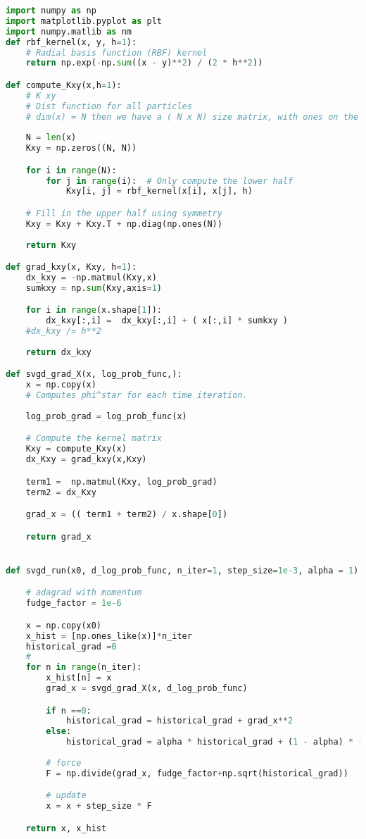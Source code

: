 \documentclass[11pt]{isr} %
\begin{document}
\begin{lstlisting}[language=Python, caption={Simple SVGD implemented}, label=code:svgd_basic]
import numpy as np
import matplotlib.pyplot as plt
import numpy.matlib as nm
def rbf_kernel(x, y, h=1):
    # Radial basis function (RBF) kernel
    return np.exp(-np.sum((x - y)**2) / (2 * h**2))

def compute_Kxy(x,h=1):
    # K xy 
    # Dist function for all particles
    # dim(x) = N then we have a ( N x N) size matrix, with ones on the diag. 
       
    N = len(x)
    Kxy = np.zeros((N, N))

    for i in range(N):
        for j in range(i):  # Only compute the lower half
            Kxy[i, j] = rbf_kernel(x[i], x[j], h)

    # Fill in the upper half using symmetry
    Kxy = Kxy + Kxy.T + np.diag(np.ones(N))
    
    return Kxy

def grad_kxy(x, Kxy, h=1):
    dx_kxy = -np.matmul(Kxy,x) 
    sumkxy = np.sum(Kxy,axis=1)

    for i in range(x.shape[1]):
        dx_kxy[:,i] =  dx_kxy[:,i] + ( x[:,i] * sumkxy )
    #dx_kxy /= h**2
    
    return dx_kxy

def svgd_grad_X(x, log_prob_func,):
    x = np.copy(x)
    # Computes phi^star for each time iteration.
    
    log_prob_grad = log_prob_func(x)

    # Compute the kernel matrix 
    Kxy = compute_Kxy(x) 
    dx_Kxy = grad_kxy(x,Kxy) 

    term1 =  np.matmul(Kxy, log_prob_grad)
    term2 = dx_Kxy

    grad_x = (( term1 + term2) / x.shape[0]) 

    return grad_x


def svgd_run(x0, d_log_prob_func, n_iter=1, step_size=1e-3, alpha = 1):

    # adagrad with momentum
    fudge_factor = 1e-6

    x = np.copy(x0)
    x_hist = [np.ones_like(x)]*n_iter
    historical_grad =0
    #
    for n in range(n_iter): 
        x_hist[n] = x
        grad_x = svgd_grad_X(x, d_log_prob_func)

        if n ==0: 
            historical_grad = historical_grad + grad_x**2
        else: 
            historical_grad = alpha * historical_grad + (1 - alpha) * (grad_x ** 2)
        
        # force 
        F = np.divide(grad_x, fudge_factor+np.sqrt(historical_grad))

        # update 
        x = x + step_size * F

    return x, x_hist
\end{lstlisting}
\end{document}
